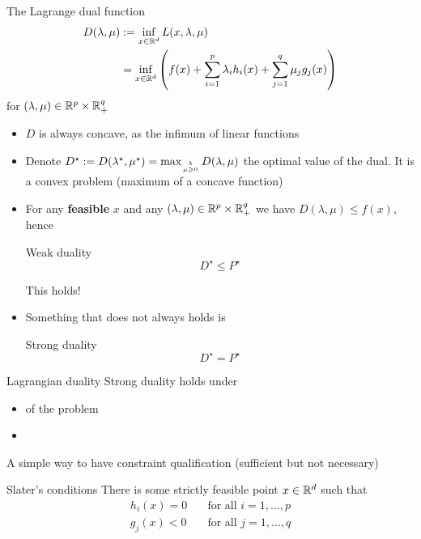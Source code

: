 \documentclass[xcolor={usenames,dvipsnames}]{beamer}
\begin{document}
\begin{frame}[allowframebreaks]

\begin{block}{ The {Lagrange dual} function }
    \begin{align*}
      D(\lambda, \mu) &:= \inf_{x \in \R^d} L(x, \lambda, \mu) \\
      &= \inf_{x \in \R^d} 
      \left( f(x) + \sum_{i=1}^p \lambda_i h_i(x) + \sum_{j=1}^q \mu_j g_j(x) \right)
    \end{align*}
    for $(\lambda, \mu) \in \R^p \times \R_+^q$
\end{block}
  \begin{itemize}
    \item $D$ is always concave, as the infimum of linear functions
    \item Denote $D^\star := D(\lambda^\star, \mu^\star) = \max_{\lambda\atop \mu \geq 0} D(\lambda, \mu)$ the optimal value of the dual. It is a convex problem (maximum of a concave function)
    \item For any \textbf{feasible} $x$ and any $(\lambda, \mu) \in \R^p \times \R_+^q$ we have $D(\lambda, \mu) \leq f(x)$, hence
    \begin{block}{Weak duality}
    \begin{equation*}
      D^\star \leq P^\star
    \end{equation*}
    \end{block}
    This   holds!
    \item Something that \alert{does not} always holds is
    \begin{block}{Strong duality}
    \begin{equation*}
      D^\star = P^\star
    \end{equation*}
    \end{block}
  \end{itemize}
\end{frame}


\begin{frame}{Lagrangian duality}
  \alert{Strong duality} holds under 
  \begin{itemize}
  \item {} of the problem 
  \item {} 
  \end{itemize}

  \medskip
  A simple way to have constraint qualification (sufficient but not necessary)
    \begin{block}{Slater's conditions}
    There is some strictly feasible point $x \in \R^d$ such that
    \begin{align*}
      h_i(x) = 0 &\quad \text{for all } i=1, \ldots, p \\
      g_j(x) < 0 &\quad \text{for all } j=1, \ldots, q
    \end{align*}
    \end{block}
\end{frame}
\end{document}
